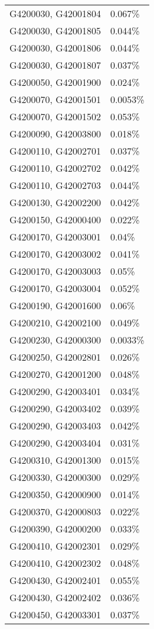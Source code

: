 \begin{longtable}[]{@{}ll@{}}
G4200030, G42001804 & 0.067\% \\
G4200030, G42001805 & 0.044\% \\
G4200030, G42001806 & 0.044\% \\
G4200030, G42001807 & 0.037\% \\
G4200050, G42001900 & 0.024\% \\
G4200070, G42001501 & 0.0053\% \\
G4200070, G42001502 & 0.053\% \\
G4200090, G42003800 & 0.018\% \\
G4200110, G42002701 & 0.037\% \\
G4200110, G42002702 & 0.042\% \\
G4200110, G42002703 & 0.044\% \\
G4200130, G42002200 & 0.042\% \\
G4200150, G42000400 & 0.022\% \\
G4200170, G42003001 & 0.04\% \\
G4200170, G42003002 & 0.041\% \\
G4200170, G42003003 & 0.05\% \\
G4200170, G42003004 & 0.052\% \\
G4200190, G42001600 & 0.06\% \\
G4200210, G42002100 & 0.049\% \\
G4200230, G42000300 & 0.0033\% \\
G4200250, G42002801 & 0.026\% \\
G4200270, G42001200 & 0.048\% \\
G4200290, G42003401 & 0.034\% \\
G4200290, G42003402 & 0.039\% \\
G4200290, G42003403 & 0.042\% \\
G4200290, G42003404 & 0.031\% \\
G4200310, G42001300 & 0.015\% \\
G4200330, G42000300 & 0.029\% \\
G4200350, G42000900 & 0.014\% \\
G4200370, G42000803 & 0.022\% \\
G4200390, G42000200 & 0.033\% \\
G4200410, G42002301 & 0.029\% \\
G4200410, G42002302 & 0.048\% \\
G4200430, G42002401 & 0.055\% \\
G4200430, G42002402 & 0.036\% \\
G4200450, G42003301 & 0.037\% \\

\end{longtable}
